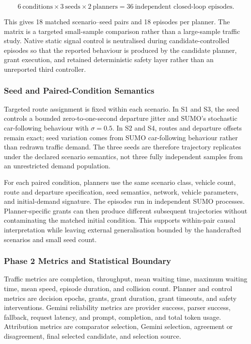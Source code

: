 \documentclass[letterpaper,10pt,conference]{ieeeconf}
\begin{document}
\[
6\ \text{conditions} \times 3\ \text{seeds} \times 2\ \text{planners}
= 36\ \text{independent closed-loop episodes}.
\]

This gives 18 matched scenario--seed pairs and 18 episodes per planner. The matrix is a targeted small-sample comparison rather than a large-sample traffic study. Native static signal control is neutralised during candidate-controlled episodes so that the reported behaviour is produced by the candidate planner, grant execution, and retained deterministic safety layer rather than an unreported third controller.



\subsubsection{Seed and Paired-Condition Semantics}



Targeted route assignment is fixed within each scenario. In S1 and S3, the seed controls a bounded zero-to-one-second departure jitter and SUMO's stochastic car-following behaviour with \(\sigma=0.5\). In S2 and S4, routes and departure offsets remain exact; seed variation comes from SUMO car-following behaviour rather than redrawn traffic demand. The three seeds are therefore trajectory replicates under the declared scenario semantics, not three fully independent samples from an unrestricted demand population.



For each paired condition, planners use the same scenario class, vehicle count, route and departure specification, seed semantics, network, vehicle parameters, and initial-demand signature. The episodes run in independent SUMO processes. Planner-specific grants can then produce different subsequent trajectories without contaminating the matched initial condition. This supports within-pair causal interpretation while leaving external generalisation bounded by the handcrafted scenarios and small seed count.



\subsubsection{Phase 2 Metrics and Statistical Boundary}



Traffic metrics are completion, throughput, mean waiting time, maximum waiting time, mean speed, episode duration, and collision count. Planner and control metrics are decision epochs, grants, grant duration, grant timeouts, and safety interventions. Gemini reliability metrics are provider success, parser success, fallback, request latency, and prompt, completion, and total token usage. Attribution metrics are comparator selection, Gemini selection, agreement or disagreement, final selected candidate, and selection source.
\end{document}
